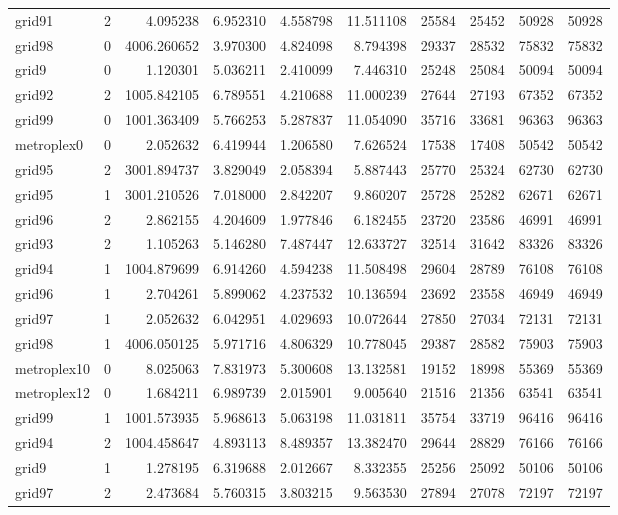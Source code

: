 \begin{longtable}{|l|r|r|r|r|r|r|r|r|r|}
grid91 & 2 & 4.095238 & 6.952310 & 4.558798 & 11.511108 & 25584 & 25452 & 50928 & 50928 \\
grid98 & 0 & 4006.260652 & 3.970300 & 4.824098 & 8.794398 & 29337 & 28532 & 75832 & 75832 \\
grid9 & 0 & 1.120301 & 5.036211 & 2.410099 & 7.446310 & 25248 & 25084 & 50094 & 50094 \\
grid92 & 2 & 1005.842105 & 6.789551 & 4.210688 & 11.000239 & 27644 & 27193 & 67352 & 67352 \\
grid99 & 0 & 1001.363409 & 5.766253 & 5.287837 & 11.054090 & 35716 & 33681 & 96363 & 96363 \\
metroplex0 & 0 & 2.052632 & 6.419944 & 1.206580 & 7.626524 & 17538 & 17408 & 50542 & 50542 \\
grid95 & 2 & 3001.894737 & 3.829049 & 2.058394 & 5.887443 & 25770 & 25324 & 62730 & 62730 \\
grid95 & 1 & 3001.210526 & 7.018000 & 2.842207 & 9.860207 & 25728 & 25282 & 62671 & 62671 \\
grid96 & 2 & 2.862155 & 4.204609 & 1.977846 & 6.182455 & 23720 & 23586 & 46991 & 46991 \\
grid93 & 2 & 1.105263 & 5.146280 & 7.487447 & 12.633727 & 32514 & 31642 & 83326 & 83326 \\
grid94 & 1 & 1004.879699 & 6.914260 & 4.594238 & 11.508498 & 29604 & 28789 & 76108 & 76108 \\
grid96 & 1 & 2.704261 & 5.899062 & 4.237532 & 10.136594 & 23692 & 23558 & 46949 & 46949 \\
grid97 & 1 & 2.052632 & 6.042951 & 4.029693 & 10.072644 & 27850 & 27034 & 72131 & 72131 \\
grid98 & 1 & 4006.050125 & 5.971716 & 4.806329 & 10.778045 & 29387 & 28582 & 75903 & 75903 \\
metroplex10 & 0 & 8.025063 & 7.831973 & 5.300608 & 13.132581 & 19152 & 18998 & 55369 & 55369 \\
metroplex12 & 0 & 1.684211 & 6.989739 & 2.015901 & 9.005640 & 21516 & 21356 & 63541 & 63541 \\
grid99 & 1 & 1001.573935 & 5.968613 & 5.063198 & 11.031811 & 35754 & 33719 & 96416 & 96416 \\
grid94 & 2 & 1004.458647 & 4.893113 & 8.489357 & 13.382470 & 29644 & 28829 & 76166 & 76166 \\
grid9 & 1 & 1.278195 & 6.319688 & 2.012667 & 8.332355 & 25256 & 25092 & 50106 & 50106 \\
grid97 & 2 & 2.473684 & 5.760315 & 3.803215 & 9.563530 & 27894 & 27078 & 72197 & 72197 \\

\end{longtable}
